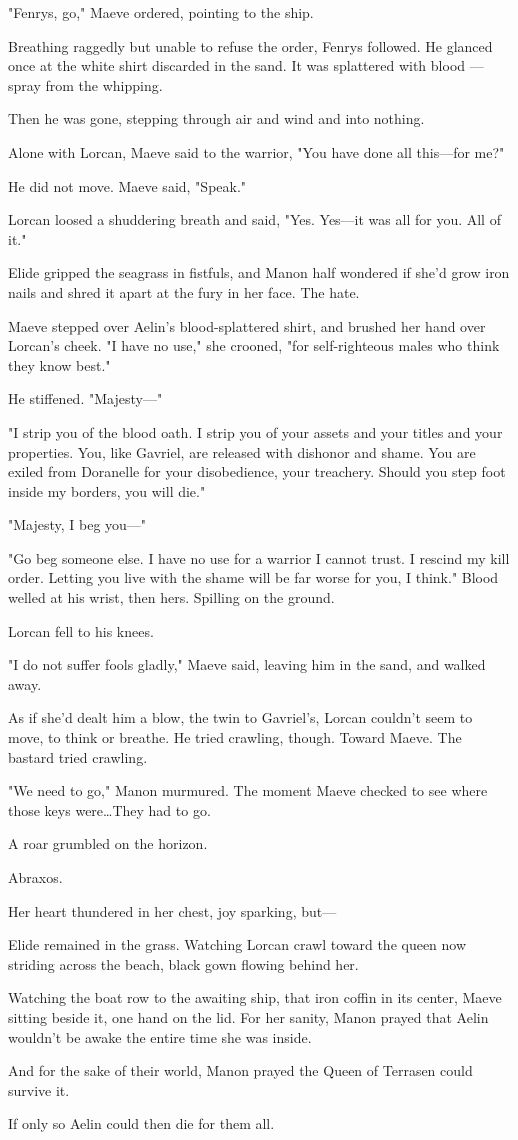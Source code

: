 "Fenrys, go," Maeve ordered, pointing to the ship.

Breathing raggedly but unable to refuse the order, Fenrys followed.
He glanced once at the white shirt discarded in the sand.
It was splattered with blood ---spray from the whipping.

Then he was gone, stepping through air and wind and into nothing.

Alone with Lorcan, Maeve said to the warrior, "You have done all this---for me?"

He did not move.
Maeve said, "Speak."

Lorcan loosed a shuddering breath and said, "Yes.
Yes---it was all for you.
All of it."

Elide gripped the seagrass in fistfuls, and Manon half wondered if she'd grow iron nails and shred it apart at the fury in her face.
The hate.

Maeve stepped over Aelin's blood-splattered shirt, and brushed her hand over Lorcan's cheek.
"I have no use," she crooned, "for self-righteous males who think they know best."

He stiffened.
"Majesty---"

"I strip you of the blood oath.
I strip you of your assets and your titles and your properties.
You, like Gavriel, are released with dishonor and shame.
You are exiled from Doranelle for your disobedience, your treachery.
Should you step foot inside my borders, you will die."

"Majesty, I beg you---"

"Go beg someone else.
I have no use for a warrior I cannot trust.
I rescind my kill order.
Letting you live with the shame will be far worse for you, I think."
Blood welled at his wrist, then hers.
Spilling on the ground.

Lorcan fell to his knees.

"I do not suffer fools gladly," Maeve said, leaving him in the sand, and walked away.

As if she'd dealt him a blow, the twin to Gavriel's, Lorcan couldn't seem to move, to think or breathe.
He tried crawling, though.
Toward Maeve.
The bastard tried crawling.

"We need to go," Manon murmured.
The moment Maeve checked to see where those keys were\ldots They had to go.

A roar grumbled on the horizon.

Abraxos.

Her heart thundered in her chest, joy sparking, but---

Elide remained in the grass.
Watching Lorcan crawl toward the queen now striding across the beach, black gown flowing behind her.

Watching the boat row to the awaiting ship, that iron coffin in its center, Maeve sitting beside it, one hand on the lid.
For her sanity, Manon prayed that Aelin wouldn't be awake the entire time she was inside.

And for the sake of their world, Manon prayed the Queen of Terrasen could survive it.

If only so Aelin could then die for them all.
